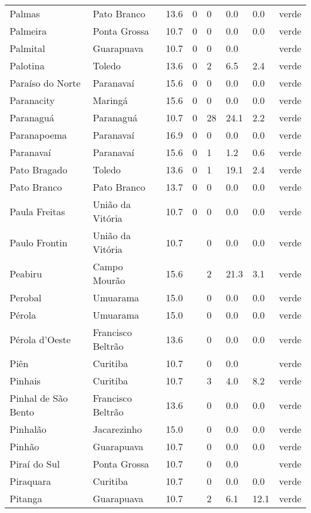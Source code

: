 \begin{longtable}{l|lllllll}
  Palmas & Pato Branco & 13.6 & 0 & 0 & 0.0 & 0.0 & verde \\ 
  Palmeira & Ponta Grossa & 10.7 & 0 & 0 & 0.0 & 0.0 & verde \\ 
  Palmital & Guarapuava & 10.7 & 0 & 0 & 0.0 &  & verde \\ 
  Palotina & Toledo & 13.6 & 0 & 2 & 6.5 & 2.4 & verde \\ 
  Paraíso do Norte & Paranavaí & 15.6 & 0 & 0 & 0.0 & 0.0 & verde \\ 
  Paranacity & Maringá & 15.6 & 0 & 0 & 0.0 & 0.0 & verde \\ 
  Paranaguá & Paranaguá & 10.7 & 0 & 28 & 24.1 & 2.2 & verde \\ 
  Paranapoema & Paranavaí & 16.9 & 0 & 0 & 0.0 & 0.0 & verde \\ 
  Paranavaí & Paranavaí & 15.6 & 0 & 1 & 1.2 & 0.6 & verde \\ 
  Pato Bragado & Toledo & 13.6 & 0 & 1 & 19.1 & 2.4 & verde \\ 
  Pato Branco & Pato Branco & 13.7 & 0 & 0 & 0.0 & 0.0 & verde \\ 
  Paula Freitas & União da Vitória & 10.7 & 0 & 0 & 0.0 & 0.0 & verde \\ 
  Paulo Frontin & União da Vitória & 10.7 &  & 0 & 0.0 & 0.0 & verde \\ 
  Peabiru & Campo Mourão & 15.6 &  & 2 & 21.3 & 3.1 & verde \\ 
  Perobal & Umuarama & 15.0 &  & 0 & 0.0 & 0.0 & verde \\ 
  Pérola & Umuarama & 15.0 &  & 0 & 0.0 & 0.0 & verde \\ 
  Pérola d'Oeste & Francisco Beltrão & 13.6 &  & 0 & 0.0 & 0.0 & verde \\ 
  Piên & Curitiba & 10.7 &  & 0 & 0.0 &  & verde \\ 
  Pinhais & Curitiba & 10.7 &  & 3 & 4.0 & 8.2 & verde \\ 
  Pinhal de São Bento & Francisco Beltrão & 13.6 &  & 0 & 0.0 & 0.0 & verde \\ 
  Pinhalão & Jacarezinho & 15.0 &  & 0 & 0.0 & 0.0 & verde \\ 
  Pinhão & Guarapuava & 10.7 &  & 0 & 0.0 & 0.0 & verde \\ 
  Piraí do Sul & Ponta Grossa & 10.7 &  & 0 & 0.0 &  & verde \\ 
  Piraquara & Curitiba & 10.7 &  & 0 & 0.0 & 0.0 & verde \\ 
  Pitanga & Guarapuava & 10.7 &  & 2 & 6.1 & 12.1 & verde \\ 

\end{longtable}
